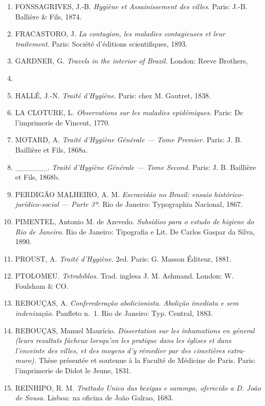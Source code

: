 \begin{enumerate}
{  land of the cocoa and the palm.} New York: Harper \& Brothers
  publishers, 1856.
\item
  FONSSAGRIVES, J.-B. \textit{Hygiène et Assainissement des villes}.
  Paris: J.-B. Ballière \& Fils, 1874.
\item
  FRACASTORO, J. \textit{La contagion, les maladies contagieuses et leur
  traitement}. Paris: Société d'éditions scientifiques, 1893.
\item
  GARDNER, G. \textit{Travels in the interior of Brazil.} London: Reeve
  Brothers,
\item
\item
  HALLÉ, J.-N. \textit{Traité d'Hygiène}. Paris: chez M. Gautret, 1838.
\item
  LA CLOTURE, L. \textit{Observations sur les maladies epidémiques.}
  Paris: De l'imprimerie de Vincent, 1770.
\item
  MOTARD, A. \textit{Traité d'Hygiène Générale --- Tome Premier.} Paris: J.
  B. Baillière et Fils, 1868a.
\item
  \_\_\_\_\_\_. \textit{Traité d'Hygiène Générale --- Tome Second.} Paris:
  J. B. Baillière et Fils, 1868b.
\item
  PERDIGÃO MALHEIRO, A. M. \textit{Escravidão no Brasil: ensaio
  histórico-jurídico-social --- Parte 3ª}. Rio de Janeiro: Typographia
  Nacional, 1867.
\item
  PIMENTEL, Antonio M. de Azevedo. \textit{Subsídios para o estudo de
  higiene do Rio de Janeiro}. Rio de Janeiro: Tipografia e Lit. De
  Carlos Gaspar da Silva, 1890.
\item
  PROUST, A. \textit{Traité d'Hygiène}. 2ed. Paris: G. Masson Éditeur,
  1881.
\item
  PTOLOMEU. \textit{Tetrabiblos.} Trad. inglesa J. M. Ashmand. London: W.
  Foulsham \& CO.
\item
  REBOUÇAS, A. \textit{Conferederação abolicionista}. \textit{Abolição
  imediata e sem indenização}. Panfleto n.~1. Rio de Janeiro: Typ.
  Central, 1883.
\item
  REBOUÇAS, Manuel Maurício. \textit{Dissertation sur les inhumations en
  géneral (leurs resultats fâcheux lorsqu'on les pratique dans les
  églises et dans l'enceinte des villes, et des moyens d'y rémedier par
  des cimetières extra-muro).} Thèse présentée et soutenue à la Faculté
  de Médicine de Paris. Paris: l'imprimerie de Didot le Jeune, 1831.
\item
  REINHIPO, R. M. \textit{Trattado Unico das bexigas e sarampo, oferecido
  a D. João de Sousa.} Lisboa: na oficina de João Galrao, 1683.

\end{enumerate}
